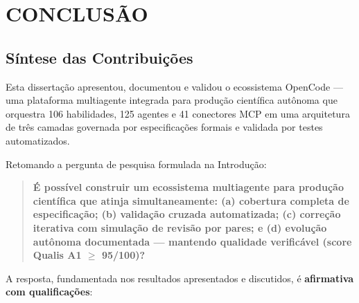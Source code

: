 
\chapter{CONCLUSÃO}
\label{ch:conclusao}

\section{Síntese das Contribuições}

Esta dissertação apresentou, documentou e validou o ecossistema OpenCode --- uma plataforma multiagente integrada para produção científica autônoma que orquestra 106 habilidades, 125 agentes e 41 conectores MCP em uma arquitetura de três camadas governada por especificações formais e validada por testes automatizados.

Retomando a pergunta de pesquisa formulada na Introdução:

\begin{quote}
  \textbf{É possível construir um ecossistema multiagente para produção científica que atinja simultaneamente: (a) cobertura completa de especificação; (b) validação cruzada automatizada; (c) correção iterativa com simulação de revisão por pares; e (d) evolução autônoma documentada --- mantendo qualidade verificável (score Qualis A1 $\geq$ 95/100)?}
\end{quote}

A resposta, fundamentada nos resultados apresentados e discutidos, é \textbf{afirmativa com qualificações}:

